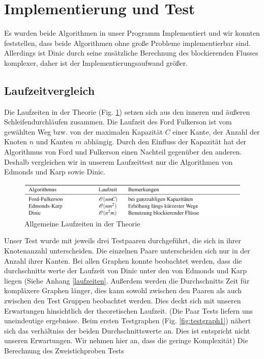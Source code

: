 \documentclass[a4paper]{llncs}
\begin{document}
\section{Implementierung und Test}
\label{Experimente}
Es wurden beide Algorithmen in unser Programm Implementiert und wir konnten feststellen, dass beide Algorithmen ohne große Probleme implementierbar sind. Allerdings ist Dinic durch seine zusätzliche Berechnung des blockierenden Flusses komplexer, daher ist der Implementierungsaufwand größer.
\subsection{Laufzeitvergleich}
Die Laufzeiten in der Theorie (Fig. \ref{fig:lzvergleich}) setzen sich aus den inneren und äußeren Schleifendurchläufen zusammen.
Die Laufzeit des Ford Fulkerson ist vom gewählten Weg bzw. von der maximalen Kapazität $C$ einer Kante, der Anzahl der Knoten $n$ und Kanten $m$  abhängig.
Durch den Einfluss der Kapazität hat der Algorithmus von Ford und Fulkerson einen Nachteil gegenüber den anderen.
Deshalb vergleichen wir in unserem Laufzeittest nur die Algorithmen von Edmonds und Karp sowie Dinic.
\begin{figure}[H] 
  \centering
     \includegraphics[scale=0.42]{lzvergleich} 
  \caption{Allgemeine Laufzeiten in der Theorie \citep{GKuA}}
  \label{fig:lzvergleich}
\end{figure}
Unser Test wurde mit jeweils drei Testpaaren durchgeführt, die sich in ihrer Knotenanzahl unterscheiden.
Die einzelnen Paare unterscheiden sich nur in der Anzahl ihrer Kanten.
Bei allen Graphen konnte beobachtet werden, dass die durchschnitts werte der Laufzeit von Dinic unter den von Edmonds und Karp liegen (Siehe Anhang \ref{laufzeiten}. 
Außerdem werden die Durchschnitts Zeit für kompläxere Graphen länger, dies kann sowohl zwischen den Paaren als auch zwischen den Test Gruppen beobachtet werden.
Dies deckt sich mit unseren Erwartungen hinsichtlich der theoretischen Laufzeit.
(Die Paar Tests liefern uns uneindeutige ergebnisse. Beim ersten Testgraphen (Fig. \ref{fig:testgraph1}) nähert sich das verhältniss der beiden Durchschnittswerte an. 
Dies ist entspricht nicht unseren Erwartungen. Wir nehmen hier an, dass die geringe Komplexität)
Die Berechnung des Zweistichproben Tests
\end{document}
